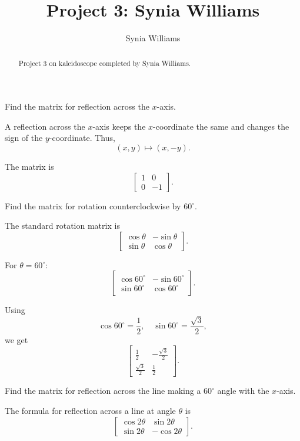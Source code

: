 \documentclass{ximera}
\title{Project 3: Synia Williams}
\author{Synia Williams}
\begin{document}
\begin{abstract}
    Project 3 on kaleidoscope completed by Synia Williams.
\end{abstract}

\maketitle

\begin{problem}
Find the matrix for reflection across the $x$-axis.
\end{problem}

A reflection across the $x$-axis keeps the $x$-coordinate the same and changes the sign of the $y$-coordinate. Thus,
\[
(x,y)\mapsto (x,-y).
\]

The matrix is
\[
\begin{bmatrix}
1 & 0\\
0 & -1
\end{bmatrix}.
\]

\begin{problem}
Find the matrix for rotation counterclockwise by $60^\circ$.
\end{problem}

The standard rotation matrix is
\[
\begin{bmatrix}
\cos\theta & -\sin\theta\\
\sin\theta & \cos\theta
\end{bmatrix}.
\]

For $\theta=60^\circ$:
\[
\begin{bmatrix}
\cos 60^\circ & -\sin 60^\circ\\
\sin 60^\circ & \cos 60^\circ
\end{bmatrix}.
\]

Using
\[
\cos 60^\circ=\frac12, \quad \sin 60^\circ=\frac{\sqrt3}{2},
\]
we get
\[
\begin{bmatrix}
\frac12 & -\frac{\sqrt3}{2}\\
\frac{\sqrt3}{2} & \frac12
\end{bmatrix}.
\]

\begin{problem}
Find the matrix for reflection across the line making a $60^\circ$ angle with the $x$-axis.
\end{problem}

The formula for reflection across a line at angle $\theta$ is
\[
\begin{bmatrix}
\cos 2\theta & \sin 2\theta\\
\sin 2\theta & -\cos 2\theta
\end{bmatrix}.
\]
\end{document}
